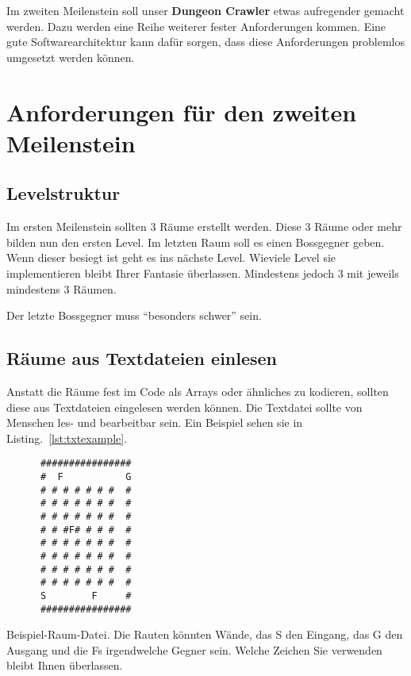 \documentclass{programmierpraktikum}
\subtitle{Dungeon Crawler --- Meilenstein 2}
\begin{document}
\maketitle
Im zweiten Meilenstein soll unser \textbf{Dungeon Crawler} etwas aufregender gemacht werden.
Dazu werden eine Reihe weiterer fester Anforderungen kommen. Eine gute Softwarearchitektur kann
dafür sorgen, dass diese Anforderungen problemlos umgesetzt werden können.
%
\section{Anforderungen für den zweiten Meilenstein}

\subsection{Levelstruktur}
Im ersten Meilenstein sollten 3 Räume erstellt werden. Diese 3 Räume oder mehr bilden nun den
ersten Level. Im letzten Raum soll es einen Bossgegner geben. Wenn dieser besiegt ist geht es
ins nächste Level. Wieviele Level sie implementieren bleibt Ihrer Fantasie überlassen.
Mindestens jedoch 3 mit jeweils mindestens 3 Räumen.

Der letzte Bossgegner muss "`besonders schwer"' sein.
\subsection{Räume aus Textdateien einlesen}
Anstatt die Räume fest im Code als Arrays oder ähnliches zu kodieren, sollten diese aus
Textdateien eingelesen werden können. Die Textdatei sollte von Menschen les- und bearbeitbar
sein. Ein Beispiel sehen sie in Listing.~\ref{lst:txtexample}.
%
\begin{center}
  \begin{listing}[h!]
    \begin{verbatim}
      ################
      #  F           G
      # # # # # # #  #
      # # # # # # #  #
      # # # # # # #  #
      # # #F# # # #  #
      # # # # # # #  #
      # # # # # # #  #
      # # # # # # #  #
      # # # # # # #  #
      S        F     #
      ################
    \end{verbatim}
    \caption{Beispiel-Raum-Datei. Die Rauten könnten Wände, das S den Eingang, das G den Ausgang und
    die Fs irgendwelche Gegner sein. Welche Zeichen Sie verwenden bleibt Ihnen
    überlassen.\label{lst:txtexample}}
  \end{listing}
\end{center}
%
\end{document}
